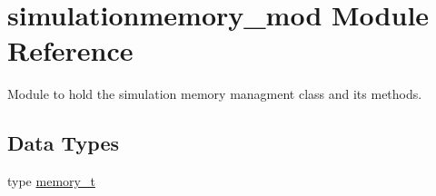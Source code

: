 \hypertarget{namespacesimulationmemory__mod}{}\section{simulationmemory\+\_\+mod Module Reference}
\label{namespacesimulationmemory__mod}


Module to hold the simulation memory managment class and its methods.  


\subsection*{Data Types}
\begin{DoxyCompactItemize}
\item 
type \mbox{\hyperlink{structsimulationmemory__mod_1_1memory__t}{memory\+\_\+t}}
\end{DoxyCompactItemize}
